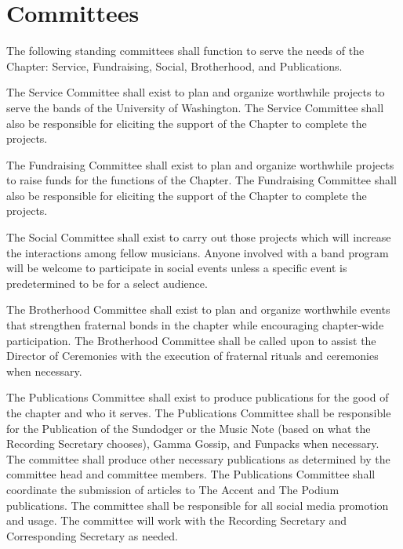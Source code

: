 \documentclass[11pt]{article}
\begin{document}
\section{Committees}
\begin{legal}
  \item
    The following standing committees shall function to serve the needs of the Chapter: Service, Fundraising, Social, Brotherhood, and Publications.
    \begin{legal}
      \item 
        The Service Committee shall exist to plan and organize worthwhile projects to serve the bands of the University of Washington.
        The Service Committee shall also be responsible for eliciting the support of the Chapter to complete the projects.
      \item 
        The Fundraising Committee shall exist to plan and organize worthwhile projects to raise funds for the functions of the Chapter.
        The Fundraising Committee shall also be responsible for eliciting the support of the Chapter to complete the projects.
      \item 
        The Social Committee shall exist to carry out those projects which will increase the interactions among fellow musicians.
        Anyone involved with a band program will be welcome to participate in social events unless a specific event is predetermined to be for a select audience.
      \item 
        The Brotherhood Committee shall exist to plan and organize worthwhile events that strengthen fraternal bonds in the chapter while encouraging chapter-wide participation.
        The Brotherhood Committee shall be called upon to assist the Director of Ceremonies with the execution of fraternal rituals and ceremonies when necessary. 
      \item
        The Publications Committee shall exist to produce publications for the good of the chapter and who it serves.
        The Publications Committee shall be responsible for the Publication of the Sundodger or the Music Note (based on what the Recording Secretary chooses), Gamma Gossip, and Funpacks when necessary.
        The committee shall produce other necessary publications as determined by the committee head and committee members.
        The Publications Committee shall coordinate the submission of articles to The Accent and The Podium publications.
        The committee shall be responsible for all social media promotion and usage.
        The committee will work with the Recording Secretary and Corresponding Secretary as needed.

\end{legal}
\end{legal}
\end{document}
